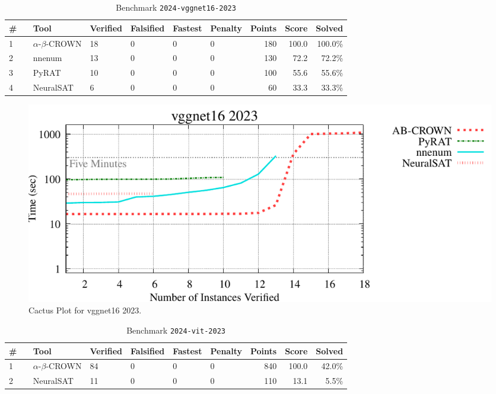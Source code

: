 \clearpage

\begin{table}[h]
\begin{center}
\caption{Benchmark \texttt{2024-vggnet16-2023}} \label{tab:cat_{cat}}
{\setlength{\tabcolsep}{2pt}
\begin{tabular}[h]{@{}llllllrrr@{}}
\toprule
\textbf{\# ~} & \textbf{Tool} & \textbf{Verified} & \textbf{Falsified} & \textbf{Fastest} & \textbf{Penalty} & \textbf{Points} & \textbf{Score} & \textbf{Solved}\\
\midrule
1 & $\alpha$-$\beta$-CROWN & 18 & 0 & 0 & 0 & 180 & 100.0 & 100.0\% \\
2 & nnenum & 13 & 0 & 0 & 0 & 130 & 72.2 & 72.2\% \\
3 & PyRAT & 10 & 0 & 0 & 0 & 100 & 55.6 & 55.6\% \\
4 & NeuralSAT & 6 & 0 & 0 & 0 & 60 & 33.3 & 33.3\% \\
\bottomrule
\end{tabular}
}
\end{center}
\end{table}



\begin{figure}[h]
\centerline{\includegraphics[width=\textwidth]{cactus/2024_vggnet16_2023.pdf}}
\caption{Cactus Plot for vggnet16 2023.}
\label{fig:quantPic}
\end{figure}


\clearpage

\begin{table}[h]
\begin{center}
\caption{Benchmark \texttt{2024-vit-2023}} \label{tab:cat_{cat}}
{\setlength{\tabcolsep}{2pt}
\begin{tabular}[h]{@{}llllllrrr@{}}
\toprule
\textbf{\# ~} & \textbf{Tool} & \textbf{Verified} & \textbf{Falsified} & \textbf{Fastest} & \textbf{Penalty} & \textbf{Points} & \textbf{Score} & \textbf{Solved}\\
\midrule
1 & $\alpha$-$\beta$-CROWN & 84 & 0 & 0 & 0 & 840 & 100.0 & 42.0\% \\
2 & NeuralSAT & 11 & 0 & 0 & 0 & 110 & 13.1 & 5.5\% \\
\bottomrule
\end{tabular}
}
\end{center}
\end{table}




